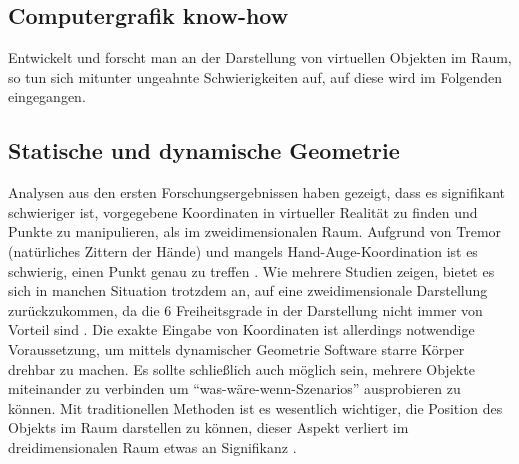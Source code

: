 \documentclass[deutsch]{llncs}
\begin{document}
\subsection{Computergrafik know-how}
Entwickelt und forscht man an der Darstellung von virtuellen Objekten im Raum, so tun sich mitunter ungeahnte Schwierigkeiten auf, auf diese wird im Folgenden eingegangen.
\subsection{Statische und dynamische Geometrie}
Analysen aus den ersten Forschungsergebnissen haben gezeigt, dass es signifikant schwieriger ist, vorgegebene Koordinaten in virtueller Realität zu finden und Punkte zu manipulieren, als im zweidimensionalen Raum. Aufgrund von Tremor (natürliches Zittern der Hände) und mangels Hand-Auge-Koordination ist es schwierig, einen Punkt genau zu treffen \cite{1667626}. 
Wie mehrere Studien zeigen, bietet es sich in manchen Situation trotzdem an, auf eine zweidimensionale Darstellung zurückzukommen, da die 6 Freiheitsgrade in der Darstellung nicht immer von Vorteil sind \cite{Bowman:1999:ITC:930593}. 
Die exakte Eingabe von Koordinaten ist allerdings notwendige Voraussetzung, um mittels dynamischer Geometrie Software starre Körper drehbar zu machen. Es sollte schließlich auch möglich sein, mehrere Objekte miteinander zu verbinden um ``was-wäre-wenn-Szenarios'' ausprobieren zu können. Mit traditionellen Methoden ist es wesentlich wichtiger, die Position des Objekts im Raum darstellen zu können, dieser Aspekt verliert im dreidimensionalen Raum etwas an Signifikanz \cite{1667626}. 
\noindent 
\end{document}
